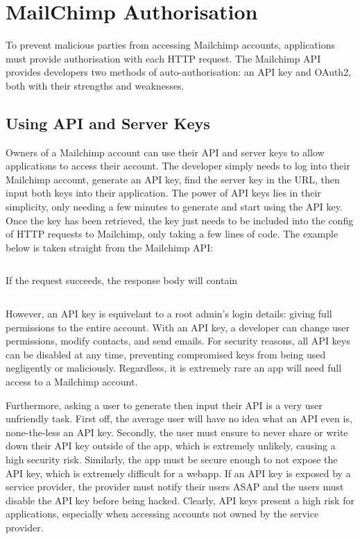 \documentclass[11pt]{article}
\begin{document}
\newpage

\section{MailChimp Authorisation}

To prevent malicious parties from accessing Mailchimp accounts, applications must provide authorisation with each HTTP request. The Mailchimp API provides developers two methods of auto-authorisation: an API key and OAuth2, both with their strengths and weaknesses.

\subsection{Using API and Server Keys}

Owners of a Mailchimp account can use their API and server keys to allow applications to access their account. The developer simply needs to log into their Mailchimp account, generate an API key, find the server key in the URL, then input both keys into their application. The power of API keys lies in their simplicity, only needing a few minutes to generate and start using the API key. Once the key has been retrieved, the key just needs to be included into the config of HTTP requests to Mailchimp, only taking a few lines of code. The example below is taken straight from the Mailchimp API:

\inputminted[linenos=true]{python}{mailchimp_examples/mailchimp_ping.py}

\noindent
If the request succeeds, the response body will contain

\inputminted{json}{mailchimp_examples/ping_response.json}

However, an API key is equivelant to a root admin's login details: giving full permissions to the entire account. With an API key, a developer can change user permissions, modify contacts, and send emails. For security reasons, all API keys can be disabled at any time, preventing compromised keys from being used negligently or maliciously. Regardless, it is extremely rare an app will need full access to a Mailchimp account.

Furthermore, asking a user to generate then input their API is a very user unfriendly task. First off, the average user will have no idea what an API even is, none-the-less an API key. Secondly, the user must ensure to never share or write down their API key outside of the app, which is extremely unlikely, causing a high security risk. Similarly, the app must be secure enough to not expose the API key, which is extremely difficult for a webapp. If an API key is exposed by a service provider, the provider must notify their users ASAP and the users must disable the API key before being hacked. Clearly, API keys present a high risk for applications, especially when accessing accounts not owned by the service provider.
\end{document}
